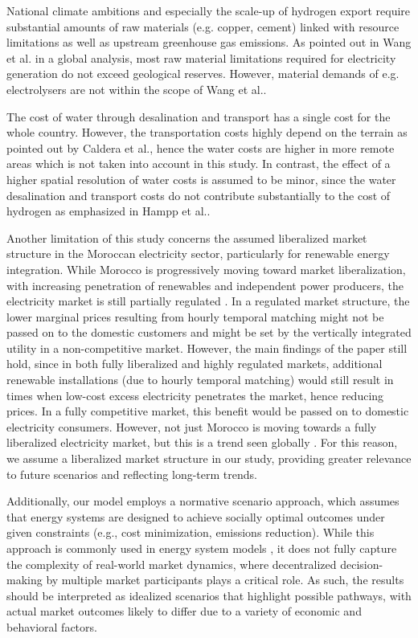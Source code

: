 National climate ambitions and especially the scale-up of hydrogen export require substantial amounts of raw materials (e.g. copper, cement) linked with resource limitations as well as upstream greenhouse gas emissions. As pointed out in Wang et al.\cite{Wang2023} in a global analysis, most raw material limitations required for electricity generation do not exceed geological reserves. However, material demands of e.g. electrolysers are not within the scope of Wang et al.\cite{Wang2023}.

The cost of water through desalination and transport has a single cost for the whole country. However, the transportation costs highly depend on the terrain as pointed out by Caldera et al.\cite{Caldera2016}, hence the water costs are higher in more remote areas which is not taken into account in this study. In contrast, the effect of a higher spatial resolution of water costs is assumed to be minor, since the water desalination and transport costs do not contribute substantially to the cost of hydrogen as emphasized in Hampp et al.\cite{Hampp2023}.

Another limitation of this study concerns the assumed liberalized market structure in the Moroccan electricity sector, particularly for renewable energy integration. While Morocco is progressively moving toward market liberalization, with increasing penetration of renewables and independent power producers, the electricity market is still partially regulated \cite{Bentaibi2021}. In a regulated market structure, the lower marginal prices resulting from hourly temporal matching might not be passed on to the domestic customers and might be set by the vertically integrated utility in a non-competitive market. However, the main findings of the paper still hold, since in both fully liberalized and highly regulated markets, additional renewable installations (due to hourly temporal matching) would still result in times when low-cost excess electricity penetrates the market, hence reducing prices. In a fully competitive market, this benefit would be passed on to domestic electricity consumers. 
However, not just Morocco is moving towards a fully liberalized electricity market, but this is a trend seen globally \cite{Fatras2022, Faia2024, Xu2020, Fattouh2021}. For this reason, we assume a liberalized market structure in our study, providing greater relevance to future scenarios and reflecting long-term trends.

Additionally, our model employs a normative scenario approach, which assumes that energy systems are designed to achieve socially optimal outcomes under given constraints (e.g., cost minimization, emissions reduction). While this approach is commonly used in energy system models \cite{Zeyen2023, Zeyen2024,Victoria2020,Franken2025,Neumann2024,Neumann2023,Neumann2022a,Neumann2021,Parzen2023,Horsch2018,Muller2024,Collins2018,Oyewo2023,Oyewo2024,Bauer2025,IEA2021}, it does not fully capture the complexity of real-world market dynamics, where decentralized decision-making by multiple market participants plays a critical role. As such, the results should be interpreted as idealized scenarios that highlight possible pathways, with actual market outcomes likely to differ due to a variety of economic and behavioral factors.